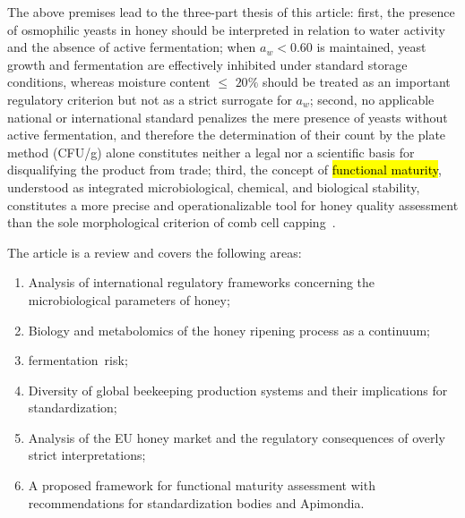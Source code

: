 \documentclass[foods,review,accept,pdftex,moreauthors]{Definitions/mdpi}
\begin{document}
The above premises lead to the three-part thesis of this article:
{
    first, the presence of osmophilic yeasts in honey should be interpreted in relation to water activity and the absence of active fermentation; when $a_w < 0.60$ is maintained, yeast growth and fermentation are effectively inhibited under standard storage conditions, whereas moisture content $\leq$ $20\%$ should be treated as an important regulatory criterion but not as a strict surrogate for $a_w$;
}
 second, no applicable national or international
standard penalizes the mere presence of yeasts without active
fermentation, and therefore the determination of their count by the
plate method (CFU/g) alone constitutes neither a legal nor a scientific
basis for disqualifying the product from trade; third, the concept of
\hl{functional maturity}, understood as integrated microbiological,
chemical, and biological stability, constitutes a more precise and
operationalizable tool for honey quality assessment than the sole
morphological criterion of comb cell
capping~\cite{zhang2021,guo2020,sun2021}.

The article is a review and covers the following areas:
\begin{enumerate}
    \item Analysis of international regulatory frameworks concerning the microbiological parameters of honey; 
    \item Biology and metabolomics of the honey ripening process as a continuum;
    \item {} \mbox{fermentation risk;} 
    \item Diversity of global beekeeping production systems and their implications for standardization;     
    \item {Analysis of the EU honey market and the regulatory consequences of overly strict interpretations;}
    \item {A proposed framework for functional maturity assessment with recommendations for standardization bodies and Apimondia.}
\end{enumerate}
\end{document}
